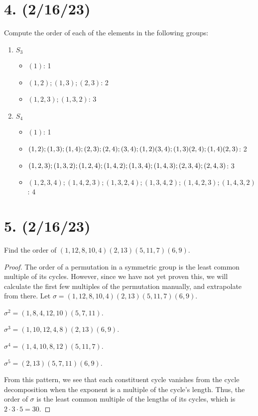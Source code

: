 \documentclass{article}
\begin{document}
\section*{4. (2/16/23)}

Compute the order of each of the elements in the following groups:

\begin{enumerate}[label=(\alph*)]
    \item $S_3$
        \begin{itemize}[itemsep=0em]
            \item $(1)$: 1
            \item $(1, 2); (1, 3); (2, 3)$: 2
            \item $(1, 2, 3); (1, 3, 2)$: 3
        \end{itemize}
    \item $S_4$
        \begin{itemize}[itemsep=0em]
            \item $(1)$: 1
            \item $(1, 2); (1, 3); (1, 4); (2, 3); (2, 4); (3, 4); (1, 2)(3, 4);\\(1, 3)(2, 4); (1, 4)(2, 3)$: 2
            \item $(1, 2, 3); (1, 3, 2); (1, 2, 4); (1, 4, 2); (1, 3, 4); (1, 4, 3);\\(2, 3, 4); (2, 4, 3)$: 3
            \item $(1, 2, 3, 4); (1, 4, 2, 3); (1, 3, 2, 4); (1, 3, 4, 2); (1, 4, 2, 3); (1, 4, 3, 2)$: 4
        \end{itemize}
\end{enumerate}

\section*{5. (2/16/23)}

Find the order of $(1, 12, 8, 10, 4)(2, 13)(5, 11, 7)(6, 9)$.

\begin{proof}
    The order of a permutation in a symmetric group is the least common multiple of its cycles. However, since we have not yet proven this, we will calculate the first few multiples of the permutation manually, and extrapolate from there. Let $\sigma = (1, 12, 8, 10, 4)(2, 13)(5, 11, 7)(6, 9)$.

    $\sigma^2 = (1, 8, 4, 12, 10)(5, 7, 11)$.

    $\sigma^3 = (1, 10, 12, 4, 8)(2, 13)(6, 9)$.

    $\sigma^4 = (1, 4, 10, 8, 12)(5, 11, 7)$.
    
    $\sigma^5 = (2, 13)(5, 7, 11)(6, 9)$.

    From this pattern, we see that each constituent cycle vanishes from the cycle decomposition when the exponent is a multiple of the cycle's length. Thus, the order of $\sigma$ is the least common multiple of the lengths of its cycles, which is $2 \cdot 3 \cdot 5 = 30$.
\end{proof}
\end{document}
